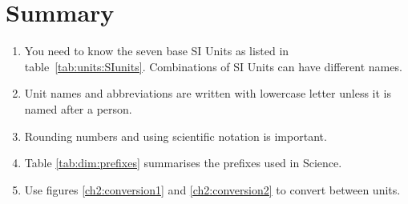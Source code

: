 
\section{Summary}
\begin{enumerate}
\item You need to know the seven base SI Units as listed in table~\ref{tab:units:SIunits}. Combinations of SI Units can have different names.
\item Unit names and abbreviations are written with lowercase letter unless it is named after a person.
\item Rounding numbers and using scientific notation is important.
\item Table \ref{tab:dim:prefixes} summarises the prefixes used in Science.
\item Use figures \ref{ch2:conversion1} and \ref{ch2:conversion2} to convert between units.
\end{enumerate}

